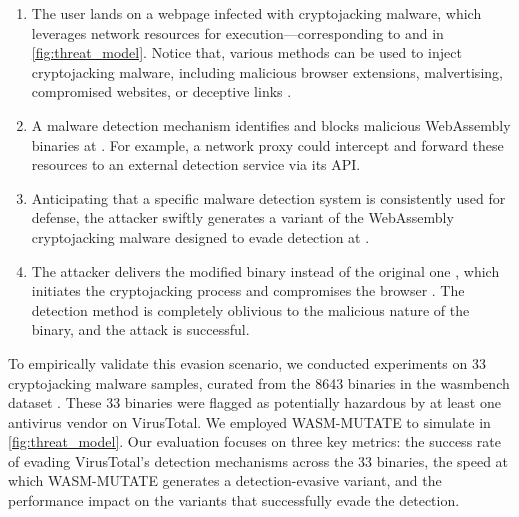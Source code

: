 \begin{enumerate}
    
    \item The user lands on a webpage infected with cryptojacking malware, which leverages network resources for execution—corresponding to  and  in \autoref{fig:threat_model}. 
    Notice that, various methods can be used to inject cryptojacking malware, including malicious browser extensions, malvertising, compromised websites, or deceptive links \cite{9566204}.
    
    \item A malware detection mechanism identifies and blocks malicious WebAssembly binaries at . 
    For example, a network proxy could intercept and forward these resources to an external detection service via its API.
    
    \item Anticipating that a specific malware detection system is consistently used for defense, the attacker swiftly generates a variant of the WebAssembly cryptojacking malware designed to evade detection at .
    
    \item The attacker delivers the modified binary instead of the original one , which initiates the cryptojacking process and compromises the browser . The detection method is completely oblivious to the malicious nature of the binary, and the attack is successful.
    
\end{enumerate}

To empirically validate this evasion scenario, we conducted experiments on 33 cryptojacking malware samples, curated from the 8643 binaries in the wasmbench dataset \cite{Hilbig2021AnES}. 
These 33 binaries were flagged as potentially hazardous by at least one antivirus vendor on VirusTotal. 
We employed WASM-MUTATE to simulate  in \autoref{fig:threat_model}. 
Our evaluation focuses on three key metrics: the success rate of evading VirusTotal's detection mechanisms across the 33 binaries, the speed at which WASM-MUTATE generates a detection-evasive variant, and the performance impact on the variants that successfully evade the detection.






